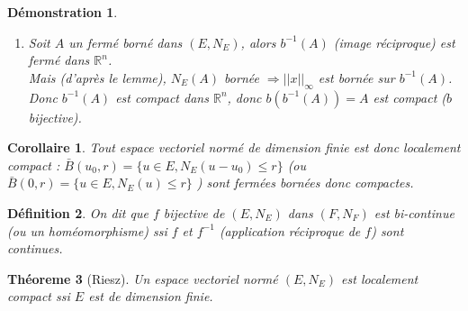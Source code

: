 \documentclass[a4paper, oneside]{report}
\theoremstyle{break}
\newtheorem{thm}{Théoreme}[section] %
\newtheorem{defi}[thm]{Définition}
\newtheorem{cor}[thm]{Corollaire}
\newtheorem*{demo}{Démonstration}
\newcommand{\R}{\mathbb{R}}
\newcommand{\evn}{espace vectoriel normé }
\begin{document}
\begin{demo}
\begin{enumerate}
\item Soit $A$ un fermé borné dans $(E,N_E)$, alors $b^{-1}(A)$ (image réciproque) est fermé dans $\R^n$.\\
Mais (d'après le lemme), $N_E(A)$ bornée $\Rightarrow ||x||_\infty$  est bornée sur $b^{-1}(A)$.\\
Donc $b^{-1}(A)$ est compact dans $\R^n$, donc $b(b^{-1}(A))=A$ est compact ($b$ bijective).
\end{enumerate}

\end{demo}


\begin{cor}
Tout \evn de dimension finie est donc localement compact : $\bar{B}(u_0,r) = \{u\in E, N_E(u-u_0) \leq r \}$ (ou $\bar{B}(0,r) = \{u\in E, N_E(u) \leq r \}$ ) sont fermées bornées donc compactes.

\end{cor}

\begin{defi}
On dit que $f$ bijective de $(E,N_E)$ dans $(F,N_F)$ est bi-continue (ou un homéomorphisme) ssi $f$ et $f^{-1}$ (application réciproque de $f$) sont continues.
\end{defi}

\begin{thm}[Riesz]

Un \evn $(E,N_E)$ est localement compact ssi $E$ est de dimension finie.
\end{thm}
\end{document}
